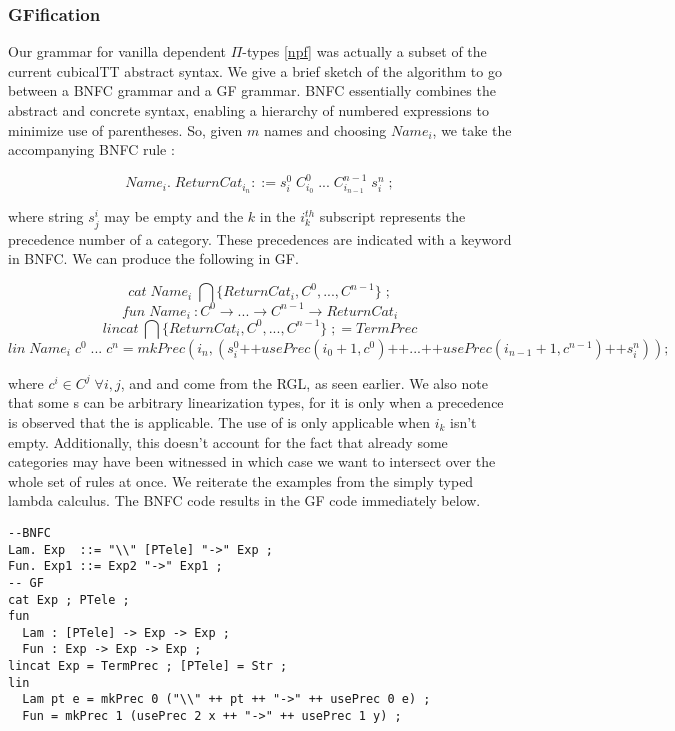 \subsubsection{GFification}

Our grammar for vanilla dependent $\Pi$-types \ref{npf} was actually a subset of
the current cubicalTT abstract syntax. We give a brief sketch of the algorithm
to go between a BNFC grammar and a GF grammar. BNFC essentially combines the
abstract and concrete syntax, enabling a hierarchy of numbered expressions
 to minimize use of parentheses. So, given $m$ names and choosing
$Name_i$, we take the accompanying BNFC rule :

$$Name_i.\; ReturnCat_{i_n} ::= s^0_{i}\;C^0_{i_0}\;...\;C^{n-1}_{i_{n-1}}\;s^n_{i}\;;$$

where string $s^i_j$ may be empty and the $k$ in the $i^{th}_k$ subscript represents the 
precedence number of a category. These precedences are indicated with a
 keyword in BNFC. We can produce the following in GF.

$$cat\; Name_i\; \bigcap\{ReturnCat_i,C^0,..., C^{n-1}\}\;;$$
$$fun\; Name_i\:{:} C^0 \rightarrow ... \rightarrow C^{n-1} \rightarrow ReturnCat_i $$
$$lincat \: \bigcap\{ReturnCat_i,C^0,..., C^{n-1}\}\;; = TermPrec$$
$$lin \; Name_i\;c^0\;... \;c^n = mkPrec(i_n,(s^0_{i}\texttt{++}usePrec(i_0+1,c^0)\texttt{++}...\texttt{++}usePrec(i_{n-1}+1,c^{n-1})\texttt{++}s^n_{i})) ;$$

where $c^i \in C^j \; \forall i,j$, and  and  come
from the RGL, as seen earlier. We also note that some s can be
arbitrary linearization types, for it is only when a precedence
is observed that the  is applicable. The use of
 is only applicable when $i_k$ isn't empty. Additionally, this
doesn't account for the fact that already some categories may have been
witnessed in which case we want to intersect over the whole set of rules at
once. We reiterate the examples from the simply typed lambda calculus. The BNFC
code results in the GF code immediately below.

\begin{verbatim}
--BNFC
Lam. Exp  ::= "\\" [PTele] "->" Exp ;
Fun. Exp1 ::= Exp2 "->" Exp1 ;
-- GF
cat Exp ; PTele ;
fun
  Lam : [PTele] -> Exp -> Exp ;
  Fun : Exp -> Exp -> Exp ;
lincat Exp = TermPrec ; [PTele] = Str ;
lin 
  Lam pt e = mkPrec 0 ("\\" ++ pt ++ "->" ++ usePrec 0 e) ;
  Fun = mkPrec 1 (usePrec 2 x ++ "->" ++ usePrec 1 y) ;
\end{verbatim}


